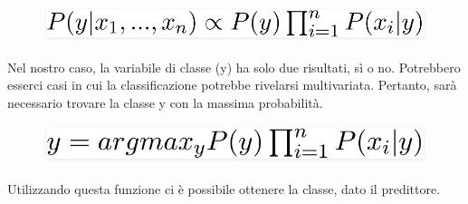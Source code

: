 \begin{figure}
    \begin{center}    
        \includegraphics[width=0.9\linewidth]{images/image22.jpeg}
    \end{center}
\end{figure}
Nel nostro caso, la variabile di classe (y) ha solo due risultati, sì o no. Potrebbero esserci casi in cui la classificazione potrebbe rivelarsi multivariata. Pertanto, sarà necessario trovare la classe y con la massima probabilità.

\begin{figure}
    \begin{center}    
        \includegraphics[width=0.9\linewidth]{images/image23.jpeg}
    \end{center}
\end{figure}
Utilizzando questa funzione ci è possibile ottenere la classe, dato il predittore.




